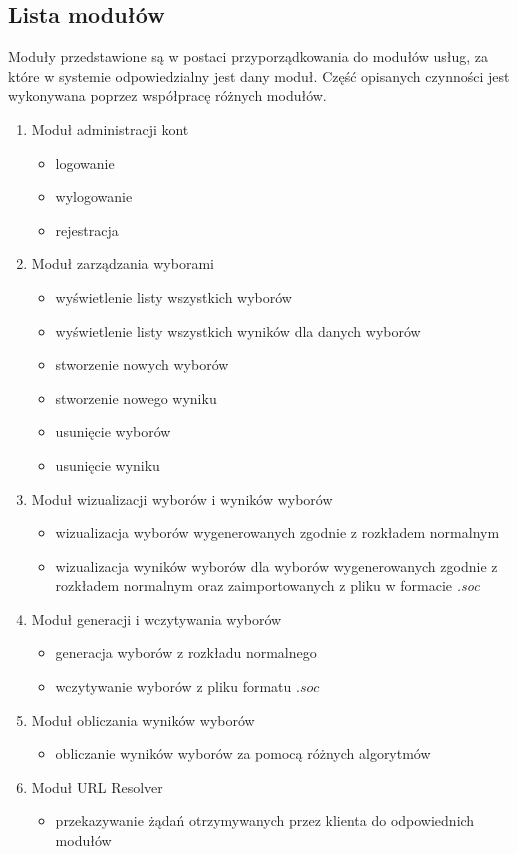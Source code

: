 \documentclass[polish,11pt]{aghthesis}
\begin{document}
\subsection{Lista modułów}
Moduły przedstawione są w postaci przyporządkowania do modułów usług, za które w
systemie odpowiedzialny jest dany moduł. Część opisanych czynności jest wykonywana
poprzez współpracę różnych modułów.

\noindent
\begin{enumerate}[leftmargin=0.5cm]
\item Moduł administracji kont
	\begin{itemize}
	\item logowanie
	\item wylogowanie
	\item rejestracja
	\end{itemize}
\item Moduł zarządzania wyborami
	\begin{itemize}
	\item wyświetlenie listy wszystkich wyborów
	\item wyświetlenie listy wszystkich wyników dla danych wyborów
	\item stworzenie nowych wyborów
	\item stworzenie nowego wyniku
	\item usunięcie wyborów
	\item usunięcie wyniku
	\end{itemize}
\item Moduł wizualizacji wyborów i wyników wyborów
	\begin{itemize}
	\item wizualizacja wyborów wygenerowanych zgodnie z rozkładem normalnym
	\item wizualizacja wyników wyborów dla wyborów wygenerowanych zgodnie z rozkładem
normalnym oraz zaimportowanych z pliku w formacie \textit{.soc}
	\end{itemize}
\item Moduł generacji i wczytywania wyborów
	\begin{itemize}
	\item generacja wyborów z rozkładu normalnego
	\item wczytywanie wyborów z pliku formatu $.soc$
	\end{itemize}
\item Moduł obliczania wyników wyborów
	\begin{itemize}
	\item obliczanie wyników wyborów za pomocą różnych algorytmów
	\end{itemize}
\item Moduł URL Resolver
	\begin{itemize}
	\item przekazywanie żądań otrzymywanych przez klienta do odpowiednich modułów
	\end{itemize}
\end{enumerate}
\end{document}
